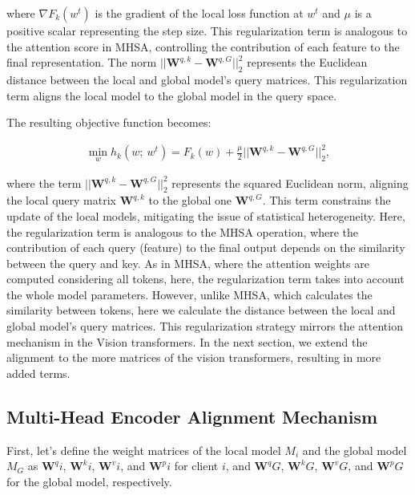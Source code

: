 where $\nabla F_k(w^t)$ is the gradient of the local loss function at $w^t$ and $\mu$ is a positive scalar representing the step size. This regularization term is analogous to the attention score in MHSA, controlling the contribution of each feature to the final representation. The norm $||\mathbf{W}^{q,k}-\mathbf{W}^{q,G}||^2_2$ represents the Euclidean distance between the local and global model's query matrices. This regularization term aligns the local model to the global model in the query space. 

The resulting objective function becomes:

\begin{align}\label{equ:modified_obj}
\min_w
h_k(w; ~w^{t}) = F_k(w) + \frac{\mu}{2}||\mathbf{W}^{q,k}-\mathbf{W}^{q,G}||^2_2,
\end{align}

where the term $||\mathbf{W}^{q,k}-\mathbf{W}^{q,G}||^2_2$ represents the squared Euclidean norm, aligning the local query matrix $\mathbf{W}^{q,k}$ to the global one $\mathbf{W}^{q,G}$. This term constrains the update of the local models, mitigating the issue of statistical heterogeneity. Here, the regularization term is analogous to the MHSA operation, where the contribution of each query (feature) to the final output depends on the similarity between the query and key. As in MHSA, where the attention weights are computed considering all tokens, here, the regularization term takes into account the whole model parameters. However, unlike MHSA, which calculates the similarity between tokens, here we calculate the distance between the local and global model's query matrices. This regularization strategy mirrors the attention mechanism in the Vision transformers. In the next section, we extend the alignment to the more matrices of the vision transformers, resulting in more added terms.

\subsection{Multi-Head Encoder Alignment Mechanism}


First, let's define the weight matrices of the local model $M_i$ and the global model $M_G$ as $\mathbf{W}^{q}{i}$, $\mathbf{W}^{k}{i}$, $\mathbf{W}^{v}{i}$, and $\mathbf{W}^{p}{i}$ for client $i$, and $\mathbf{W}^{q}{G}$, $\mathbf{W}^{k}{G}$, $\mathbf{W}^{v}{G}$, and $\mathbf{W}^{p}{G}$ for the global model, respectively.

